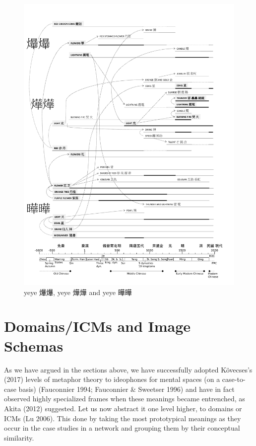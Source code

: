 \begin{figure}
\centering
\includegraphics{ideos/yeye.pdf}
\caption{\label{fig:yeye}yeye 爗爗, yeye 燁燁 and yeye 曄曄}
\end{figure}

\section{Domains/ICMs and Image
Schemas}\label{domainsicms-and-image-schemas}

As we have argued in the sections above, we have successfully adopted
Kövecses's (2017) levels of metaphor theory to ideophones for mental
spaces (on a case-to-case basis) (Fauconnier 1994; Fauconnier \&
Sweetser 1996) and have in fact observed highly specialized frames when
these meanings became entrenched, as Akita (2012) suggested. Let us now
abstract it one level higher, to domains or ICMs (Lu 2006). This done by
taking the most prototypical meanings as they occur in the case studies
in a network and grouping them by their conceptual similarity.

